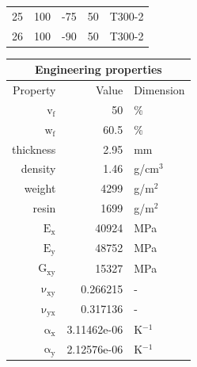 \documentclass[a4paper,landscape,oneside,11pt,twocolumn]{memoir}
\begin{document}
\begin{table}[!htbp]
\begin{tabular}[t]{rcrrl}
      25 &  100 &   -75 & 50 & T300-2\\
      26 &  100 &   -90 & 50 & T300-2\\
      \bottomrule
    \end{tabular}\hspace{0.02\textwidth}
    \begin{tabular}[t]{rrl}
      \multicolumn{3}{c}{\small\textbf{Engineering properties}}\\[0.1em]
      \toprule
      Property & Value & Dimension\\
      \midrule
      $\mathrm{v_f}$ & 50 &\%\\
      $\mathrm{w_f}$ & 60.5 &\%\\
      thickness & 2.95 & mm\\
      density & 1.46 & g/cm$^3$\\
      weight & 4299 & g/m$^2$\\
      resin & 1699 & g/m$^2$\\
      \midrule
      $\mathrm{E_x}$ &    40924 & MPa\\
      $\mathrm{E_y}$ &    48752 & MPa\\
      $\mathrm{G_{xy}}$ &    15327 & MPa\\
      $\mathrm{\nu_{xy}}$ & 0.266215 &-\\
      $\mathrm{\nu_{yx}}$ & 0.317136 &-\\
      $\mathrm{\alpha_x}$ & 3.11462e-06 & K$^{-1}$\\
      $\mathrm{\alpha_y}$ & 2.12576e-06 & K$^{-1}$\\
      \bottomrule
    \end{tabular}
\end{table}
\end{document}
